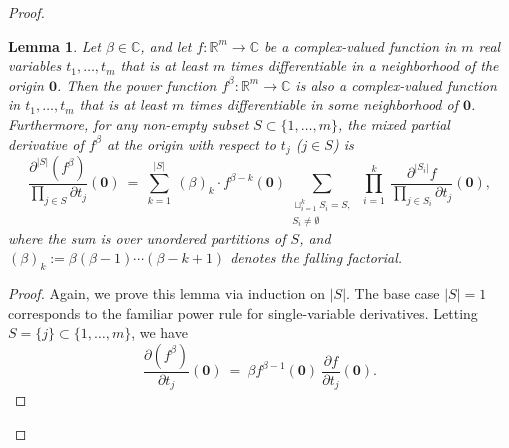 \documentclass[12pt, reqno, oneside]{amsart}
\newtheorem{lemma}[corollary]{Lemma}
\numberwithin{equation}{section}
\begin{document}
\begin{proof}
\begin{lemma}\label{lemma:power-rule}
Let $\beta \in \mathbb{C}$, and let $f:\mathbb{R}^m\to\mathbb{C}$ be a complex-valued function in $m$ real variables $t_1,\dots,t_m$ that is at least $m$ times differentiable in a neighborhood of the origin $\mathbf{0}$. Then the power function $f^\beta:\mathbb{R}^m\to\mathbb{C}$ is also a complex-valued function in $t_1,\dots,t_m$ that is at least $m$ times differentiable in some neighborhood of $\mathbf{0}$. Furthermore, for any non-empty subset $S \subset \{1, \dots, m\}$, the mixed partial derivative of $f^\beta$ at the origin with respect to $t_j$ ($j\in S$) is 
\begin{equation}\label{eq:power-rule}
\frac{\partial^{|S|}(f^\beta)}{\prod_{j \in S}\partial t_j}(\mathbf{0}) \ = \ \sum_{k=1}^{|S|} \ (\beta)_k \cdot f^{\beta-k}(\mathbf{0})\sum_{\substack{\sqcup_{i=1}^k S_i = S, \\ S_i \neq \emptyset}} \ \prod_{i=1}^k \ \frac{\partial^{|S_i|}f}{\prod_{j\in S_i}\partial t_j}(\mathbf{0}),
\end{equation}
where the sum is over unordered partitions of $S$, and $(\beta)_k:=\beta(\beta-1)\cdots(\beta-k+1)$ denotes the falling factorial. 
\end{lemma} 

\begin{proof}
Again, we prove this lemma via induction on $|S|$. The base case $|S|=1$ corresponds to the familiar power rule for single-variable derivatives. Letting $S=\{j\}\subset\{1,\dots,m\}$, we have
\begin{equation}
    \frac{\partial (f^\beta)}{\partial t_j}(\mathbf{0}) \ = \ \beta f^{\beta-1}(\mathbf{0}) \ \frac{\partial f}{\partial t_j}(\mathbf{0}).
\end{equation}


\end{proof}
\end{proof}
\end{document}
